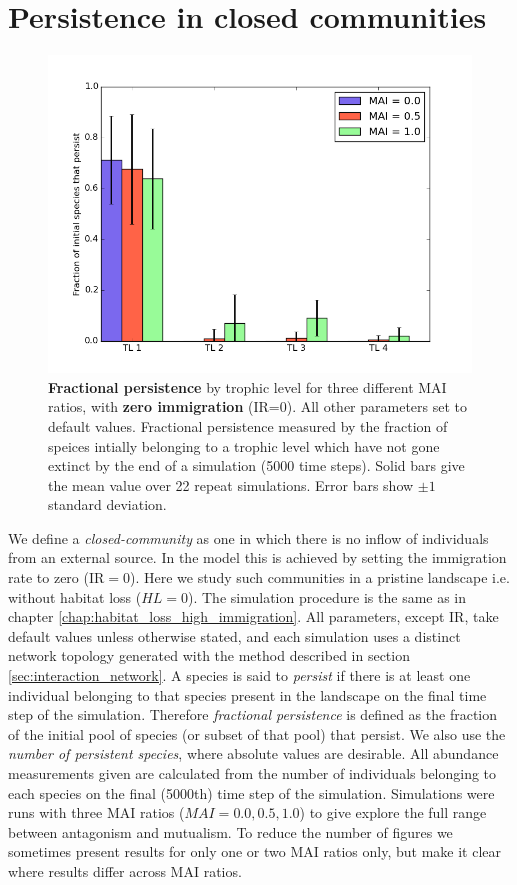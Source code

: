 \section{Persistence in closed communities}
\label{sec:closed_communities}

\begin{figure}
	\centering
	\includegraphics[width=0.8\linewidth]{"figures/persistence/hist_species_per_tl_zeroIR"}
	\caption[Fractional persistence at zero IR.]{\textbf{Fractional persistence} by trophic level for three different MAI ratios, with \textbf{zero immigration} (IR=0). All other parameters set to default values. Fractional persistence measured by the fraction of speices intially belonging to a trophic level which have not gone extinct by the end of a simulation (5000 time steps). Solid bars give the mean value over 22 repeat simulations. Error bars show $\pm 1$ standard deviation.}
	\label{fig:mvp_hist_zeroIR}
\end{figure}

We define a \emph{closed-community} as one in which there is no inflow of individuals from an external source. In the model this is achieved by setting the immigration rate to zero (IR$=0$). Here we study such communities in a pristine landscape i.e. without habitat loss ($HL=0$). The simulation procedure is the same as in chapter \ref{chap:habitat_loss_high_immigration}. All parameters, except IR, take default values unless otherwise stated, and each simulation uses a distinct network topology generated with the method described in section \ref{sec:interaction_network}. A species is said to \emph{persist} if there is at least one individual belonging to that species present in the landscape on the final time step of the simulation. Therefore \emph{fractional persistence} is defined as the fraction of the initial pool of species (or subset of that pool) that persist. We also use the \emph{number of persistent species}, where absolute values are desirable. All abundance measurements given are calculated from the number of individuals belonging to each species on the final (5000th) time step of the simulation.
Simulations were runs with three MAI ratios ($MAI=0.0,0.5,1.0$) to give explore the full range between antagonism and mutualism. To reduce the number of figures we sometimes present results for only one or two MAI ratios only, but make it clear where results differ across MAI ratios.

